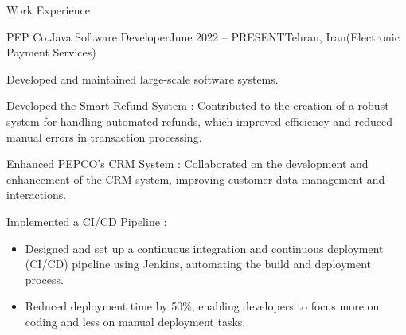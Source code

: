 \documentclass[]{kyvernitis-resume}
\begin{document}
\begin{section}{Work Experience}
    \begin{subsection}{PEP Co.}{Java Software Developer}{June 2022 -- PRESENT}{Tehran, Iran}{(Electronic Payment Services)}




		
		\item Developed and maintained large-scale software systems.
		\item Developed the Smart Refund System : Contributed to the creation of a robust system for handling automated refunds, which improved efficiency and reduced manual errors in transaction processing.
		\item Enhanced PEPCO's CRM System : Collaborated on the development and enhancement of the CRM system, improving customer data management and interactions.
		\item Implemented a CI/CD Pipeline :
			\begin{itemize}
				\item Designed and set up a continuous integration and continuous deployment (CI/CD) pipeline using Jenkins, automating the build and deployment process.
				\item Reduced deployment time by 50\%, enabling developers to focus more on coding and less on manual deployment tasks.


\end{itemize}
\end{subsection}
\end{section}
\end{document}
